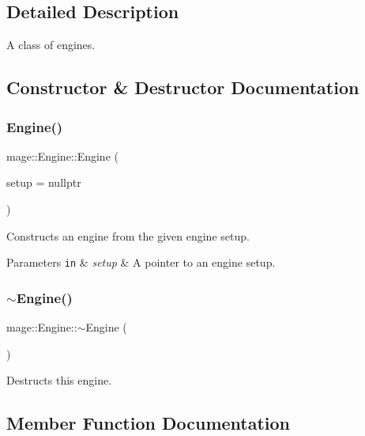 \subsection{Detailed Description}
A class of engines. 

\subsection{Constructor \& Destructor Documentation}
\hypertarget{classmage_1_1_engine_a4d15f81bb7d97b659d2d72ead3a88319}{}\label{classmage_1_1_engine_a4d15f81bb7d97b659d2d72ead3a88319} 
\subsubsection{\texorpdfstring{Engine()}{Engine()}}
{\footnotesize\ttfamily mage\+::\+Engine\+::\+Engine (\begin{DoxyParamCaption}\item[{const \hyperlink{structmage_1_1_engine_setup}{Engine\+Setup} $\ast$}]{setup = {\ttfamily nullptr} }\end{DoxyParamCaption})}

Constructs an engine from the given engine setup.


\begin{DoxyParams}[1]{Parameters}
\mbox{\tt in}  & {\em setup} & A pointer to an engine setup. \\
\hline
\end{DoxyParams}
\hypertarget{classmage_1_1_engine_a34628556f8397d70ed018d71e343c2f5}{}\label{classmage_1_1_engine_a34628556f8397d70ed018d71e343c2f5} 
\subsubsection{\texorpdfstring{$\sim$\+Engine()}{~Engine()}}
{\footnotesize\ttfamily mage\+::\+Engine\+::$\sim$\+Engine (\begin{DoxyParamCaption}{ }\end{DoxyParamCaption})\hspace{0.3cm}{\ttfamily [virtual]}}

Destructs this engine. 

\subsection{Member Function Documentation}
\hypertarget{classmage_1_1_engine_a627271c15bb1ecb1079f9780d64e0d77}{}\label{classmage_1_1_engine_a627271c15bb1ecb1079f9780d64e0d77} 
